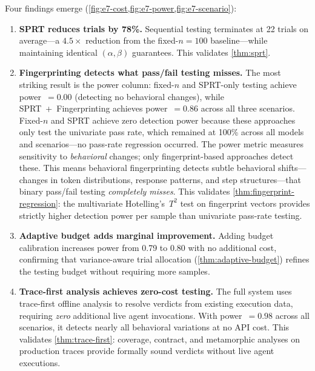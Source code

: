 Four findings emerge (\cref{fig:e7-cost,fig:e7-power,fig:e7-scenario}):

\begin{enumerate}[leftmargin=*]
  \item \textbf{SPRT reduces trials by 78\%.} Sequential testing
    terminates at 22 trials on average---a $4.5\times$ reduction from
    the fixed-$n = 100$ baseline---while maintaining identical
    $(\alpha, \beta)$ guarantees. This validates \cref{thm:sprt}.

  \item \textbf{Fingerprinting detects what pass/fail testing misses.}
    The most striking result is the power column: fixed-$n$ and
    SPRT-only testing achieve power~$= 0.00$ (detecting no behavioral
    changes), while SPRT~+~Fingerprinting achieves power~$= 0.86$
    across all three scenarios.
    Fixed-$n$ and SPRT achieve zero detection power because these
    approaches only test the univariate pass rate, which remained at
    100\% across all models and scenarios---no pass-rate regression
    occurred. The power metric measures sensitivity to
    \emph{behavioral} changes; only fingerprint-based approaches
    detect these.
    This means behavioral fingerprinting detects subtle behavioral
    shifts---changes in token distributions, response patterns, and
    step structures---that binary pass/fail testing \emph{completely
    misses}. This validates \cref{thm:fingerprint-regression}: the
    multivariate Hotelling's~$T^2$ test on fingerprint vectors provides
    strictly higher detection power per sample than univariate
    pass-rate testing.

  \item \textbf{Adaptive budget adds marginal improvement.}
    Adding budget calibration increases power from 0.79 to 0.80 with
    no additional cost, confirming that variance-aware trial allocation
    (\cref{thm:adaptive-budget}) refines the testing budget without
    requiring more samples.

  \item \textbf{Trace-first analysis achieves zero-cost testing.}
    The full system uses trace-first offline analysis to resolve
    verdicts from existing execution data, requiring \emph{zero}
    additional live agent invocations. With power~$= 0.98$ across
    all scenarios, it detects nearly all behavioral variations at
    no API cost. This validates
    \cref{thm:trace-first}: coverage, contract, and metamorphic
    analyses on production traces provide formally sound verdicts
    without live agent executions.
\end{enumerate}


